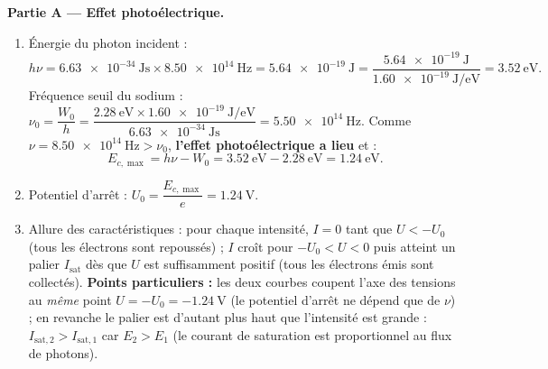 \documentclass[11pt]{article}
\begin{document}
\begin{corrige}
\textbf{Partie A — Effet photoélectrique.}
\begin{enumerate}
\item Énergie du photon incident :
\[ h\nu = \SI{6,63e-34}{\joule\second}\times\SI{8,50e14}{\hertz} = \SI{5,64e-19}{\joule} = \frac{\SI{5,64e-19}{\joule}}{\SI{1,60e-19}{\joule\per\electronvolt}} = \SI{3,52}{\electronvolt}. \]
Fréquence seuil du sodium : $\nu_0 = \dfrac{W_0}{h} = \dfrac{\SI{2,28}{\electronvolt}\times\SI{1,60e-19}{\joule\per\electronvolt}}{\SI{6,63e-34}{\joule\second}} = \SI{5,50e14}{\hertz}$.
Comme $\nu = \SI{8,50e14}{\hertz} > \nu_0$, \textbf{l'effet photoélectrique a lieu} et :
\[ E_{c,\max} = h\nu - W_0 = \SI{3,52}{\electronvolt} - \SI{2,28}{\electronvolt} = \SI{1,24}{\electronvolt}. \]
\item Potentiel d'arrêt : $U_0 = \dfrac{E_{c,\max}}{e} = \SI{1,24}{\volt}$.
\item Allure des caractéristiques : pour chaque intensité, $I = 0$ tant que $U < -U_0$ (tous les électrons sont repoussés) ; $I$ croît pour $-U_0 < U < 0$ puis atteint un palier $I_{\text{sat}}$ dès que $U$ est suffisamment positif (tous les électrons émis sont collectés). \textbf{Points particuliers :} les deux courbes coupent l'axe des tensions au \emph{même} point $U = -U_0 = \SI{-1,24}{\volt}$ (le potentiel d'arrêt ne dépend que de $\nu$) ; en revanche le palier est d'autant plus haut que l'intensité est grande : $I_{\text{sat},2} > I_{\text{sat},1}$ car $E_2 > E_1$ (le courant de saturation est proportionnel au flux de photons).
\begin{popfigure}

\end{popfigure}
\end{enumerate}
\end{corrige}
\end{document}
